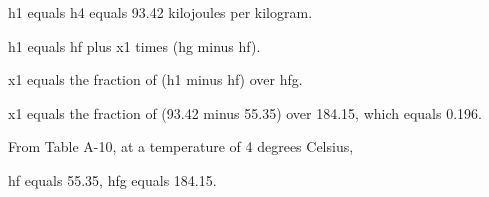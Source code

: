 h1 equals h4 equals 93.42 kilojoules per kilogram.

h1 equals hf plus x1 times (hg minus hf).

x1 equals the fraction of (h1 minus hf) over hfg.

x1 equals the fraction of (93.42 minus 55.35) over 184.15, which equals 0.196.

From Table A-10, at a temperature of 4 degrees Celsius,

hf equals 55.35,
hfg equals 184.15.